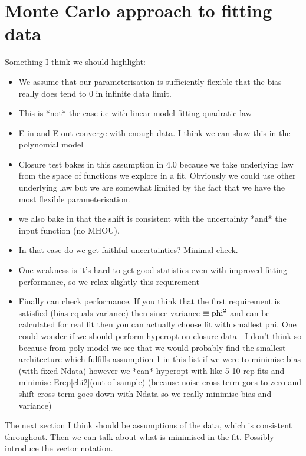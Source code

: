 \section{Monte Carlo approach to fitting data}
Something I think we should highlight:
\begin{itemize}
    \item We assume that our parameterisation is sufficiently flexible that
    the bias really does tend to 0 in infinite data limit.
    \item This is *not* the case i.e with linear model fitting quadratic law
    \item E in and E out converge with enough data. I think we can show this
    in the polynomial model
    \item Closure test bakes in this assumption in 4.0 because we take underlying
    law from the space of functions we explore in a fit. Obviously we could use
    other underlying law but we are somewhat limited by the fact that we have the
    most flexible parameterisation.
    \item we also bake in that the shift is consistent with the uncertainty
    *and* the input function (no MHOU).
    \item In that case do we get faithful uncertainties? Minimal check.
    \item One weakness is it's hard to get good statistics even with improved
    fitting performance, so we relax slightly this requirement
    \item Finally can check performance. If you think that the first requirement
    is satisfied (bias equals variance) then since variance $\equiv {\rm phi}^2$ and can be
    calculated for real fit then you can actually choose fit with smallest phi.
    One could wonder if we should perform hyperopt on closure data - I don't think
    so because from poly model we see that we would probably find the smallest
    architecture which fulfills assumption 1 in this list if we were to minimise
    bias (with fixed Ndata) however we *can* hyperopt with like 5-10 rep fits
    and minimise Erep[chi2](out of sample) (because noise cross term goes to zero
    and shift cross term goes down with Ndata so we really minimise bias and variance)
\end{itemize}
The next section I think should be assumptions of the data, which is consistent
throughout. Then we can talk about what is minimised in the fit. Possibly
introduce the vector notation.

